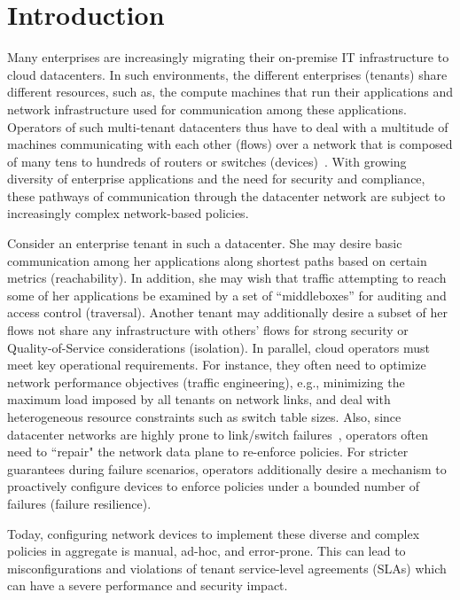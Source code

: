 \section{Introduction}

Many enterprises are increasingly migrating their on-premise IT
infrastructure to cloud datacenters. In such environments, the
different enterprises (tenants) share different resources, such as,
the compute machines that run their applications and network
infrastructure used for communication among these applications.
Operators of such multi-tenant datacenters thus have to deal with a
multitude of machines communicating with each other (flows) over a
network that is composed of many tens to hundreds of routers or
switches (devices)~\cite{mpa-imc15}. With growing diversity of
enterprise applications and the need for security and compliance,
these pathways of communication through the datacenter network are
subject to increasingly complex network-based policies.

Consider an enterprise tenant in such a datacenter. She may desire
basic communication among her applications along shortest paths based
on certain metrics (reachability). In addition, she may wish that
traffic attempting to reach some of her applications be examined by a
set of ``middleboxes'' for auditing and access control
(traversal). Another tenant may additionally desire a subset of her
flows not share any infrastructure with others' flows for strong
security or Quality-of-Service considerations (isolation).  In
parallel, cloud operators must meet key operational requirements. For
instance, they often need to optimize network performance objectives
(traffic engineering), e.g., minimizing the maximum load imposed by
all tenants on network links, and deal with heterogeneous resource
constraints such as switch table sizes. Also, since datacenter
networks are highly prone to link/switch
failures~\cite{datacenterfailures}, operators often need to ``repair" the
network data plane to re-enforce policies. For stricter guarantees
during failure scenarios, operators additionally desire a mechanism to
proactively configure devices to enforce policies under a bounded
number of failures (failure resilience).

Today, configuring network devices to implement these diverse and
complex policies in aggregate is manual, ad-hoc, and error-prone.
This can lead to misconfigurations and violations of tenant
service-level agreements (SLAs) which can have a severe performance
and security impact.

